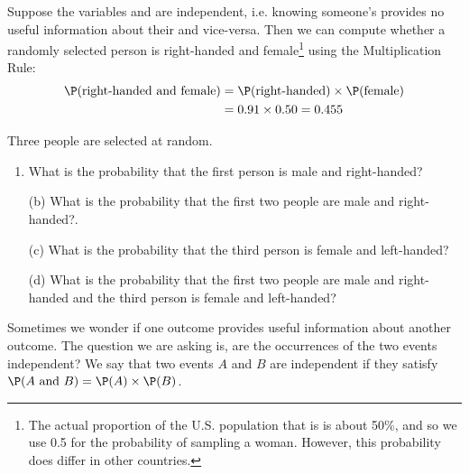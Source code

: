 \documentclass{ccg-topic}
\begin{document}
Suppose the variables  and
 are independent,
i.e. knowing someone's  provides no useful
information about their  and vice-versa.
Then we can compute whether a randomly selected person is
right-handed and female\footnote{The actual proportion of
  the U.S. population that is  is about 50\%,
  and so we use 0.5 for the probability of sampling a woman.
  However, this probability does differ in other countries.}
using the Multiplication Rule:
\begin{align*}
\P(\text{right-handed and female})
    &= \P(\text{right-handed}) \times  \P(\text{female}) \\
    &= 0.91 \times  0.50 = 0.455
\end{align*}


\begin{todo}
Three people are selected at random.\footnotemark \vspace{-1.5mm}
\begin{enumerate}
\setlength{\itemsep}{0mm}
\item What is the probability that the first person is male and right-handed?
\item[(b)] What is the probability that the first two people are male and right-handed?.
\item[(c)] What is the probability that the third person is female and left-handed?
\item[(d)] What is the probability that the first two people are male and right-handed and the third person is female and left-handed?
\end{enumerate}
\end{todo}

Sometimes we wonder if one outcome provides useful information about another outcome. The question we are asking is, are the occurrences of the two events independent? We say that two events $A$ and $B$ are independent if they satisfy
$\P(A \text{ and }B) = \P(A) \times  \P(B)$.
\end{document}
